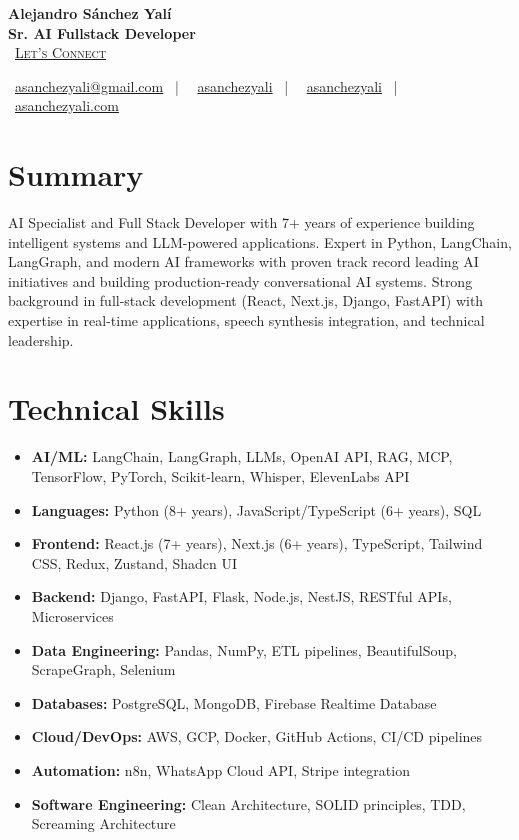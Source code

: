 \documentclass[letterpaper,11pt]{article}
\newcommand{\normalfaCalendar}{{\mdseries\faCalendar}}
\newcommand{\normalfaEnvelope}{{\mdseries\faEnvelope}}
\newcommand{\normalfaLinkedin}{{\mdseries\faLinkedin}}
\newcommand{\normalfaGithub}{{\mdseries\faGithub}}
\newcommand{\normalfaGlobe}{{\mdseries\faGlobe}}
\begin{document}
\begin{center}
\textbf{\Huge Alejandro Sánchez Yalí}\\[0.2em]
\textbf{\Large Sr. AI Fullstack Developer}\\[0.4em]
\small
\normalfaCalendar\ \href{https://cal.com/asanchezyali/full-time-opportunities}{\textsc{Let's Connect}}

\vspace{0.8em}
\normalfaEnvelope\ \href{mailto:asanchezyali@gmail.com}{asanchezyali@gmail.com}  ~|~
\normalfaLinkedin\ \href{https://www.linkedin.com/in/asanchezyali}{asanchezyali} ~|~
\normalfaGithub\ \href{https://github.com/asanchezyali}{asanchezyali}  ~|~
\normalfaGlobe\ \href{https://asanchezyali.com}{asanchezyali.com}
\end{center}

\section{Summary}
AI Specialist and Full Stack Developer with 7+ years of experience building intelligent systems and LLM-powered applications. Expert in Python, LangChain, LangGraph, and modern AI frameworks with proven track record leading AI initiatives and building production-ready conversational AI systems. Strong background in full-stack development (React, Next.js, Django, FastAPI) with expertise in real-time applications, speech synthesis integration, and technical leadership.

\section{Technical Skills}
\begin{itemize}[leftmargin=*, itemsep=0pt]
  \item \textbf{AI/ML:} LangChain, LangGraph, LLMs, OpenAI API, RAG, MCP, TensorFlow, PyTorch, Scikit-learn, Whisper, ElevenLabs API
  \item \textbf{Languages:} Python (8+ years), JavaScript/TypeScript (6+ years), SQL
  \item \textbf{Frontend:} React.js (7+ years), Next.js (6+ years), TypeScript, Tailwind CSS, Redux, Zustand, Shadcn UI
  \item \textbf{Backend:} Django, FastAPI, Flask, Node.js, NestJS, RESTful APIs, Microservices
  \item \textbf{Data Engineering:} Pandas, NumPy, ETL pipelines, BeautifulSoup, ScrapeGraph, Selenium
  \item \textbf{Databases:} PostgreSQL, MongoDB, Firebase Realtime Database
  \item \textbf{Cloud/DevOps:} AWS, GCP, Docker, GitHub Actions, CI/CD pipelines
  \item \textbf{Automation:} n8n, WhatsApp Cloud API, Stripe integration
  \item \textbf{Software Engineering:} Clean Architecture, SOLID principles, TDD, Screaming Architecture
\end{itemize}
\end{document}
